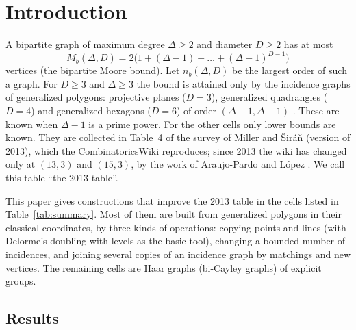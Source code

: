 \documentclass[11pt]{amsart}
\theoremstyle{definition}
\theoremstyle{remark}
\numberwithin{equation}{section}
\newcommand{\nb}{n_b}
\newcommand{\Mb}{M_b}
\begin{document}
\section{Introduction}\label{sec:intro}

A bipartite graph of maximum degree $\Delta\ge2$ and diameter $D\ge2$ has at most
\[
\Mb(\Delta,D)=2\bigl(1+(\Delta-1)+\dots+(\Delta-1)^{D-1}\bigr)
\]
vertices (the bipartite Moore bound). Let $\nb(\Delta,D)$ be the largest order of such a graph. For $D\ge3$ and
$\Delta\ge3$ the bound is attained only by the incidence graphs of generalized polygons: projective planes ($D=3$),
generalized quadrangles ($D=4$) and generalized hexagons ($D=6$) of order $(\Delta-1,\Delta-1)$
\cite{FeitHigman,MS13}. These are known when $\Delta-1$ is a prime power. For the other cells only lower bounds are
known. They are collected in Table~4 of the survey of Miller and \v{S}ir\'a\v{n} \cite{MS13} (version of 2013), which
the CombinatoricsWiki \cite{CW} reproduces; since 2013 the wiki has changed only at $(13,3)$ and $(15,3)$, by the work of
Araujo-Pardo and L\'opez \cite{AL20}. We call this table ``the 2013 table''.

This paper gives constructions that improve the 2013 table in the cells listed in Table~\ref{tab:summary}. Most of them
are built from generalized polygons in their classical coordinates, by three kinds of operations: copying points and
lines (with Delorme's doubling with levels \cite{D85a} as the basic tool), changing a bounded number of incidences, and
joining several copies of an incidence graph by matchings and new vertices. The remaining cells are Haar graphs
(bi-Cayley graphs) of explicit groups.

\subsection*{Results}
\end{document}
